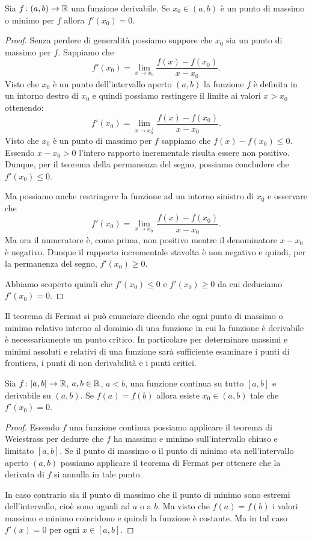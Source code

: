 \begin{theorem}[Fermat]
\mymark{***}
Sia $f\colon (a,b)\to {\mathbb R}$ una funzione derivabile.
Se $x_0\in (a,b)$ è un punto di massimo o minimo per $f$ allora
$f'(x_0)=0$.
\end{theorem}
%
\begin{proof}
\mymark{***}
Senza perdere di generalità possiamo suppore che $x_0$ sia un punto di massimo per $f$.
Sappiamo che
\[
  f'(x_0) = \lim_{x\to x_0}\frac{f(x)-f(x_0)}{x-x_0}.
\]
Visto che $x_0$ è un punto dell'intervallo aperto $(a,b)$ la funzione $f$ è definita in un intorno destro di $x_0$ e quindi possiamo restingere il limite ai valori $x>x_0$ ottenendo:
\[
  f'(x_0) = \lim_{x\to x_0^+}\frac{f(x) - f(x_0)}{x-x_0}.
\]
Visto che $x_0$ è un punto di massimo per $f$ sappiamo che $f(x)-f(x_0)\le 0$. Essendo $x-x_0>0$ l'intero rapporto incrementale risulta essere non positivo.
Dunque, per il teorema della permanenza del segno,
possiamo concludere che $f'(x_0)\le 0$.

Ma possiamo anche restringere la funzione ad un intorno sinistro di $x_0$ e osservare che
\[
  f'(x_0) = \lim_{x\to x_0^-}\frac{f(x)-f(x_0)}{x-x_0}.
\]
Ma ora il numeratore è, come prima, non positivo mentre il denominatore $x-x_0$ è negativo. Dunque il rapporto incrementale stavolta è non negativo e quindi, per la permanenza del segno, $f'(x_0) \ge 0$.

Abbiamo scoperto quindi che $f'(x_0)\le 0$ e $f'(x_0)\ge 0$
da cui deduciamo $f'(x_0)=0$.
\end{proof}

Il teorema di Fermat si può
enunciare dicendo che ogni punto di massimo o minimo relativo interno
al dominio di una funzione in cui la funzione è derivabile
è necessariamente un punto critico.
In particolare per determinare massimi e minimi assoluti e relativi
di una funzione sarà sufficiente esaminare i punti di frontiera,
i punti di non derivabilità e i punti critici.


\begin{theorem}[Rolle]
\mymark{***}
%
Sia $f\colon [a,b]\to {\mathbb R}$, $a,b\in {\mathbb R}$, $a<b$, una funzione continua su tutto $[a,b]$ e derivabile su $(a,b)$.
%
Se $f(a) = f(b)$ allora esiste $x_0 \in (a,b)$ tale che $f'(x_0)=0$.
\end{theorem}
%
\begin{proof}
\mymark{***}
Essendo $f$ una funzione continua
possiamo applicare il teorema di Weiestrass per dedurre che $f$ ha massimo e 
minimo sull'intervallo chiuso e limitato $[a,b]$. 
Se il punto di massimo o il punto di minimo sta nell'intervallo aperto 
$(a,b)$ possiamo applicare il teorema di Fermat per ottenere che la derivata 
di $f$ si annulla in tale punto.

In caso contrario sia il punto di massimo che il punto di minimo sono estremi 
dell'intervallo, cioè sono uguali ad $a$ o a $b$. Ma visto che $f(a)=f(b)$ 
i valori massimo e minimo coincidono e quindi la funzione è costante. 
Ma in tal caso $f'(x)=0$ per ogni $x\in [a,b]$.
\end{proof}

